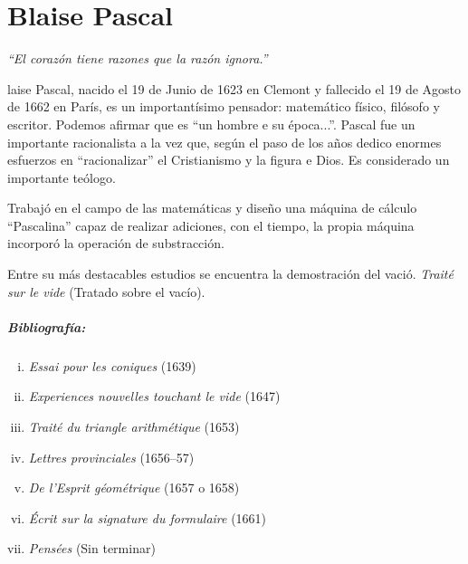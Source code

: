 \pagestyle{plain}
\chapter{Blaise Pascal}
\label{chap:blaisePascal}


\begin{flushright}
\textit{``El corazón tiene razones que la razón ignora.''}
\end{flushright}


{

laise Pascal, nacido el 19 de Junio de 1623 en Clemont y fallecido el 19 de Agosto de 1662 en París, es un importantísimo pensador: matemático físico, filósofo y escritor. Podemos afirmar que es ``un hombre e su época...''.
Pascal fue un importante racionalista a la vez que, según el paso de los años dedico enormes esfuerzos en ``racionalizar'' el Cristianismo y la figura e Dios. Es considerado un importante teólogo.

}

Trabajó en el campo de las matemáticas y diseño una máquina de cálculo ``Pascalina'' capaz de realizar adiciones, con el tiempo, la propia máquina incorporó la operación de substracción.


Entre su más destacables estudios se encuentra la demostración del vació. \textit{Traité sur le vide} (Tratado sobre el vacío).


\paragraph*{Bibliografía:}
\begin{enumerate}[i.]
\item \textit{Essai pour les coniques} (1639) 
\item \textit{Experiences nouvelles touchant le vide} (1647)
\item \textit{Traité du triangle arithmétique} (1653)
\item \textit{Lettres provinciales} (1656–57)
\item \textit{De l'Esprit géométrique} (1657 o 1658)
\item \textit{Écrit sur la signature du formulaire} (1661)
\item \textit{Pensées} (Sin terminar)
\end{enumerate}


